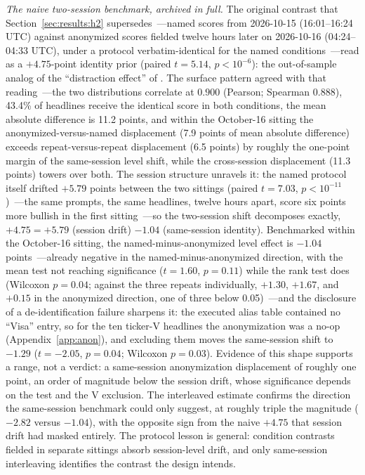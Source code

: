 \emph{The naive two-session benchmark, archived in full.} The original contrast that Section~\ref{sec:results:h2} supersedes~---named scores from 2026-10-15 (16:01--16:24 UTC) against anonymized scores fielded twelve hours later on 2026-10-16 (04:24--04:33 UTC), under a protocol verbatim-identical for the named conditions~---read as a $+4.75$-point identity prior (paired $t=5.14$, $p<10^{-6}$): the out-of-sample analog of the ``distraction effect'' of \citet{glasserman2023}. The surface pattern agreed with that reading~---the two distributions correlate at $0.900$ (Pearson; Spearman $0.888$), 43.4\% of headlines receive the identical score in both conditions, the mean absolute difference is 11.2 points, and within the October-16 sitting the anonymized-versus-named displacement (7.9 points of mean absolute difference) exceeds repeat-versus-repeat displacement (6.5 points) by roughly the one-point margin of the same-session level shift, while the cross-session displacement (11.3 points) towers over both. The session structure unravels it: the named protocol itself drifted $+5.79$ points between the two sittings (paired $t=7.03$, $p<10^{-11}$)~---the same prompts, the same headlines, twelve hours apart, score six points more bullish in the first sitting~---so the two-session shift decomposes exactly, $+4.75 = +5.79$ (session drift) $-1.04$ (same-session identity). Benchmarked within the October-16 sitting, the named-minus-anonymized level effect is $-1.04$ points~---already negative in the named-minus-anonymized direction, with the mean test not reaching significance ($t=1.60$, $p=0.11$) while the rank test does (Wilcoxon $p=0.04$; against the three repeats individually, $+1.30$, $+1.67$, and $+0.15$ in the anonymized direction, one of three below 0.05)~---and the disclosure of a de-identification failure sharpens it: the executed alias table contained no ``Visa'' entry, so for the ten ticker-V headlines the anonymization was a no-op (Appendix~\ref{app:anon}), and excluding them moves the same-session shift to $-1.29$ ($t=-2.05$, $p=0.04$; Wilcoxon $p=0.03$). Evidence of this shape supports a range, not a verdict: a same-session anonymization displacement of roughly one point, an order of magnitude below the session drift, whose significance depends on the test and the V exclusion. The interleaved estimate confirms the direction the same-session benchmark could only suggest, at roughly triple the magnitude ($-2.82$ versus $-1.04$), with the opposite sign from the naive $+4.75$ that session drift had masked entirely. The protocol lesson is general: condition contrasts fielded in separate sittings absorb session-level drift, and only same-session interleaving identifies the contrast the design intends.

